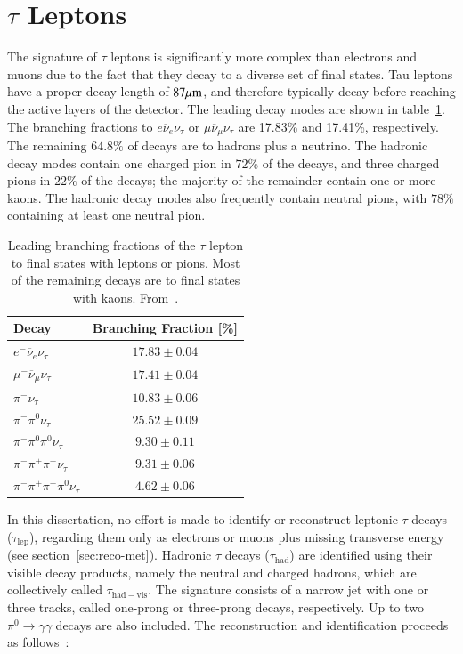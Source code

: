 \section{$\tau$ Leptons}\label{sec:event-reconstruction-taus}
The signature of $\tau$ leptons is significantly more complex than electrons and muons due to the fact that they decay to a diverse set of final states. Tau leptons have a proper decay length of $87 \mu\mathrm{m}$, and therefore typically decay before reaching the active layers of the detector. The leading decay modes are shown in table~\ref{table:reco-tau-decays}. The branching fractions to $e\overline{\nu}_e\nu_{\tau}$ or $\mu\overline{\nu}_{\mu}\nu_{\tau}$ are 17.83\% and 17.41\%, respectively. The remaining $64.8\%$ of decays are to hadrons plus a neutrino. The hadronic decay modes contain one charged pion in $72\%$ of the decays, and three charged pions in $22\%$ of the decays; the majority of the remainder contain one or more kaons. The hadronic decay modes also frequently contain neutral pions, with $78\%$ containing at least one neutral pion. 


\begin{table}[htbp]
	\centering
	\begin{tabular}{|l|c|}
		\hline
		Decay & Branching Fraction [\%] \\
		\hline
		$e^- \overline{\nu}_e \nu_{\tau}$ & $17.83 \pm 0.04$ \\
		\hline
		$\mu^- \overline{\nu}_{\mu} \nu_{\tau}$ & $17.41 \pm 0.04$ \\
		\hline
		$\pi^- \nu_{\tau}$ & $10.83 \pm 0.06$ \\
		\hline
		$\pi^- \pi^0 \nu_{\tau}$ & $25.52 \pm 0.09$ \\
		\hline
		$\pi^- \pi^0\pi^0\nu_{\tau}$ & $ 9.30 \pm 0.11$ \\
		\hline
		$\pi^-\pi^+\pi^-\nu_{\tau}$ & $9.31 \pm 0.06$ \\
		\hline
		$\pi^-\pi^+\pi^-\pi^0\nu_{\tau}$ & $4.62 \pm 0.06$ \\
		\hline
	\end{tabular}
	\caption{Leading branching fractions of the $\tau$ lepton to final states with leptons or pions. Most of the remaining decays are to final states with kaons. From~\cite{pdg}.}
	\label{table:reco-tau-decays}
\end{table}

In this dissertation, no effort is made to identify or reconstruct leptonic $\tau$ decays ($\tau_{\mathrm{lep}}$), regarding them only as electrons or muons plus missing transverse energy (see section~\ref{sec:reco-met}). Hadronic $\tau$ decays ($\tau_{\mathrm{had}}$) are identified using their visible decay products, namely the neutral and charged hadrons, which are collectively called $\tau_{\mathrm{had-vis}}$. The signature consists of a narrow jet with one or three tracks, called one-prong or three-prong decays, respectively. Up to two $\pi^0\rightarrow\gamma\gamma$ decays are also included. The reconstruction and identification proceeds as follows~\cite{TheATLASCollaboration:2014tga}:

